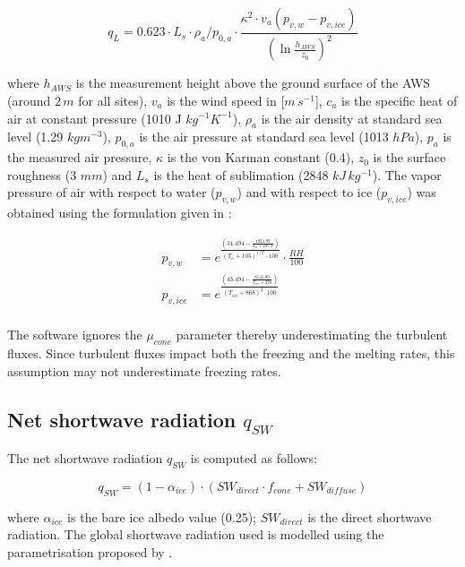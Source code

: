 \documentclass[utf8]{frontiersSCNS}
\begin{document}
\begin{equation}
	q_{L}= 0.623 \cdot L_s \cdot \rho_{a}/p_{0,a} \cdot \frac{\kappa^2 \cdot
	v_a(p_{v,w}-p_{v,ice})}{{(\ln{\frac{h_{AWS}}{z_{0}}})}^2}
\end{equation}

where $h_{AWS}$ is the measurement height above the ground surface of the AWS (around $2\,m$ for all sites),
$v_a$ is the wind speed in [$m\,s^{-1}$], $c_a$ is the specific heat of air at constant pressure (1010 J
$kg^{-1} K^{-1}$), $\rho_{a}$ is the air density at standard sea level (1.29 $kg m^{-3}$), $p_{0,a}$ is the air
pressure at standard sea level (1013 $hPa$), $p_{a}$ is the measured air pressure, $\kappa$ is the von Karman
constant (0.4), $z_{0}$ is the surface roughness (3 $mm$) and $L_s$ is the heat of sublimation (2848
$kJ\,kg^{-1}$).  The vapor pressure of air with respect to water ($p_{v,w}$) and with respect to ice
($p_{v,ice}$) was obtained using the formulation given in \cite{huangSimpleAccurateFormula2018} :

\begin{equation}
	\begin{split}
		p_{v,w}&=e^{\frac{(34.494 - \frac{4924.99}{T_{a} + 237.1})}{(T_a + 105)^{1.57} \cdot 100}} \cdot \frac{RH}{100} \\
		p_{v,ice}&=e^{\frac{(43.494 - \frac{6545.89}{T_{ice} + 278})}{(T_{ice} + 868)^{2} \cdot 100}} \\
	\end{split} \label{eqn:vp}
\end{equation}

The software ignores the $\mu_{cone}$ parameter thereby underestimating the turbulent fluxes. Since turbulent
fluxes impact both the freezing and the melting rates, this assumption may not underestimate freezing rates.

\subsection{Net shortwave radiation \texorpdfstring{$q_{SW}$}{Lg}}
\label{sec:SW}

The net shortwave radiation $q_{SW}$ is computed as follows:

\begin{equation} q_{SW} = (1- \alpha_{ice}) \cdot ( SW_{direct} \cdot f_{cone} + SW_{diffuse})
\label{eqn:SW} \end{equation}

where $\alpha_{ice}$ is the bare ice albedo value (0.25); $SW_{direct}$ is the direct shortwave radiation. The
global shortwave radiation used is modelled using the parametrisation proposed by \cite{woolfComputationSolarElevation1968}.
\end{document}
